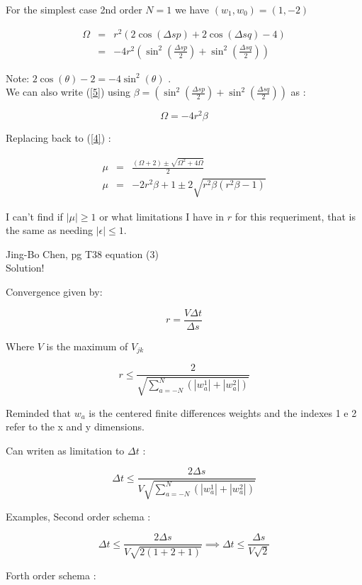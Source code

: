 \documentclass[legalpaper, 12pt]{article}
\begin{document}
For the simplest case 2nd order $ N=1 $ we have $ (w_1, w_0) = (1, -2) $

\begin{eqnarray}
\Omega	&=& r^2 \left( 2\cos(\Delta s p) + 2\cos(\Delta s q) - 4\right) \nonumber \\
	&=& -4r^2 \left( \sin^2(\frac{\Delta s p}{2}) + \sin^2(\frac{\Delta s q}{2}) \right) \label{5}
\end{eqnarray}

Note:  $ 2 \cos(\theta) - 2 = -4 \sin ^2 (\theta) $ .\\

We can also write (\ref{5}) using $ \beta = \left( \sin^2(\frac{\Delta s p}{2}) + \sin^2(\frac{\Delta s q}{2}) \right) $ as :

$$ \Omega = -4r^2\beta $$

Replacing back to (\ref{4}) :

\begin{eqnarray}
\mu &=& \frac{(\Omega+2) \pm \sqrt{\Omega^2 + 4\Omega}}{2} \nonumber \\
\mu &=& -2r^2\beta+1 \pm 2\sqrt{r^2\beta(r^2\beta-1)} \label{6}
\end{eqnarray}

I can't find if $ | \mu | \geq 1 $ or what limitations I have in $r$ for this requeriment, that is the same as needing $ | \epsilon | \leq 1  $. 

\newpage

Jing-Bo Chen, pg T38 equation (3) \\
Solution!
\bigskip

Convergence given by:

$$ r = \frac{V \Delta t}{\Delta s} $$ 

Where $ V $ is the maximum of $ V_{jk} $ 

$$ r \leq \frac{2}{\sqrt{\sum_{a=-N}^{N} (|w_a^1| + |w_a^2|)}} $$

Reminded that $w_a$ is the centered finite differences weights and the indexes 1 e 2 refer to the x and y dimensions.

Can writen as limitation to $ \Delta t $ :

$$ \Delta t \leq \frac{2 \Delta s}{ V \sqrt{\sum_{a=-N}^{N} (|w_a^1| + |w_a^2|)}} $$

Examples, 
Second order schema :

$$ \Delta t \leq \frac{2 \Delta s}{ V \sqrt{2(1+2+1)}} \implies \Delta t \leq \frac{ \Delta s}{ V \sqrt{2}} $$

Forth order schema :
\end{document}
